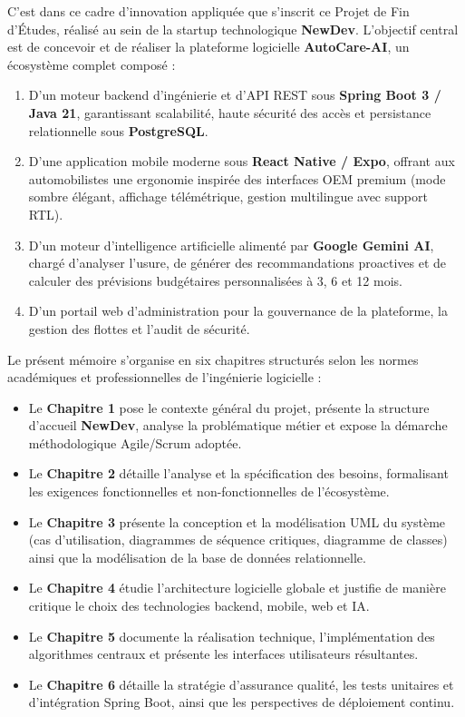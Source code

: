 \documentclass[12pt,a4paper,twoside,openright]{report}
\newcommand{\itembullet}{\textcolor{secondaryBlue}{$\blacktriangleright$}}
\begin{document}
  C'est dans ce cadre d'innovation appliqu\'ee que s'inscrit ce Projet de Fin d'\'Etudes, r\'ealis\'e au sein de la startup technologique \textbf{NewDev}. L'objectif central est de concevoir et de r\'ealiser la plateforme logicielle \textbf{AutoCare-AI}, un \'ecosyst\`eme complet compos\'e :
  \begin{enumerate}
    \item D'un moteur backend d'ing\'enierie et d'API REST sous \textbf{Spring Boot 3 / Java 21}, garantissant scalabilit\'e, haute s\'ecurit\'e des acc\`es et persistance relationnelle sous \textbf{PostgreSQL}.
    \item D'une application mobile moderne sous \textbf{React Native / Expo}, offrant aux automobilistes une ergonomie inspir\'ee des interfaces OEM premium (mode sombre \'el\'egant, affichage t\'el\'em\'etrique, gestion multilingue avec support RTL).
    \item D'un moteur d'intelligence artificielle aliment\'e par \textbf{Google Gemini AI}, charg\'e d'analyser l'usure, de g\'en\'erer des recommandations proactives et de calculer des pr\'evisions budg\'etaires personnalis\'ees \`a 3, 6 et 12 mois.
    \item D'un portail web d'administration pour la gouvernance de la plateforme, la gestion des flottes et l'audit de s\'ecurit\'e.
  \end{enumerate}

  Le pr\'esent m\'emoire s'organise en six chapitres structur\'es selon les normes acad\'emiques et professionnelles de l'ing\'enierie logicielle :
  \begin{itemize}[label=\itembullet]
    \item Le \textbf{Chapitre 1} pose le contexte g\'en\'eral du projet, pr\'esente la structure d'accueil \textbf{NewDev}, analyse la probl\'ematique m\'etier et expose la d\'emarche m\'ethodologique Agile/Scrum adopt\'ee.
    \item Le \textbf{Chapitre 2} d\'etaille l'analyse et la sp\'ecification des besoins, formalisant les exigences fonctionnelles et non-fonctionnelles de l'\'ecosyst\`eme.
    \item Le \textbf{Chapitre 3} pr\'esente la conception et la mod\'elisation UML du syst\`eme (cas d'utilisation, diagrammes de s\'equence critiques, diagramme de classes) ainsi que la mod\'elisation de la base de donn\'ees relationnelle.
    \item Le \textbf{Chapitre 4} \'etudie l'architecture logicielle globale et justifie de mani\`ere critique le choix des technologies backend, mobile, web et IA.
    \item Le \textbf{Chapitre 5} documente la r\'ealisation technique, l'impl\'ementation des algorithmes centraux et pr\'esente les interfaces utilisateurs r\'esultantes.
    \item Le \textbf{Chapitre 6} d\'etaille la strat\'egie d'assurance qualit\'e, les tests unitaires et d'int\'egration Spring Boot, ainsi que les perspectives de d\'eploiement continu.
  \end{itemize}
\end{document}
